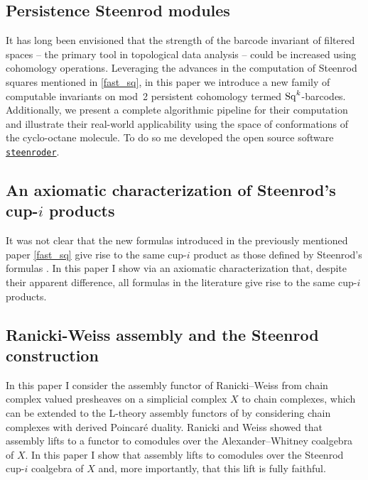 \documentclass{amsart}
\begin{document}
\subsection{Persistence Steenrod modules {\rm \cite{medina2022per_st}}} \label{per_st}

It has long been envisioned that the strength of the barcode invariant of filtered spaces -- the primary tool in topological data analysis -- could be increased using cohomology operations.
Leveraging the advances in the computation of Steenrod squares mentioned in \cref{fast_sq}, in this paper we introduce a new family of computable invariants on mod~2 persistent cohomology termed $\operatorname{Sq}^k$-barcodes.
Additionally, we present a complete algorithmic pipeline for their computation and illustrate their real-world applicability using the space of conformations of the cyclo-octane molecule.
To do so me developed the open source software \href{https://steenroder.readthedocs.io/en/latest/}{\texttt{steenroder}}.

\subsection{An axiomatic characterization of Steenrod's cup-$i$ products {\rm \cite{medina2022axiomatic}}} \label{axiomatic}

It was not clear that the new formulas introduced in the previously mentioned paper \cref{fast_sq} give rise to the same cup-$i$ product as those defined by Steenrod's formulas \cite{steenrod1947products}.
In this paper I show via an axiomatic characterization that, despite their apparent difference, all formulas in the literature give rise to the same cup-$i$ products.

\subsection{Ranicki-Weiss assembly and the Steenrod construction {\rm \cite{medina2022assembly}}} \label{assembly}

In this paper I consider the assembly functor of Ranicki--Weiss \cite{ranicki1990assembly} from chain complex valued presheaves on a simplicial complex $X$ to chain complexes, which can be extended to the L-theory assembly functors of \cite{ranicki1992topological} by considering chain complexes with derived Poincar\'e duality.
Ranicki and Weiss showed that assembly lifts to a functor to comodules over the Alexander--Whitney coalgebra of $X$.
In this paper I show that assembly lifts to comodules over the Steenrod cup-$i$ coalgebra of $X$ and, more importantly, that this lift is fully faithful.
\end{document}

